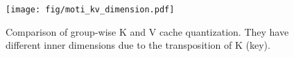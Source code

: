 \begin{figure}[t] 
  \centering 
  \texttt{[image: fig/moti\_kv\_dimension.pdf]}  
  \caption{\small Comparison of group-wise K and V cache quantization. They have different inner dimensions due to the transposition of K (key).}

  \label{fig:kv_process}
\end{figure}